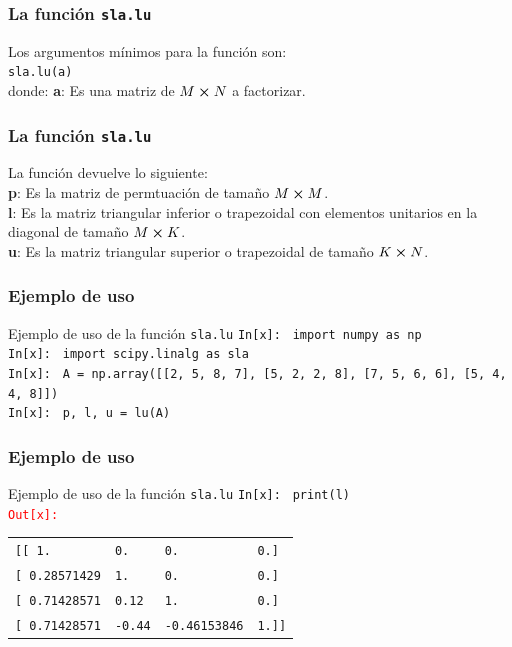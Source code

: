 \begin{frame}[fragile]
\frametitle{La función \texttt{sla.lu}}
Los argumentos mínimos para la función son:
\\
\medskip
\verb|sla.lu(a)|
\\
\medskip
donde:
\textbf{a}: Es una matriz de $M \cp N$ a factorizar.
\end{frame}
\begin{frame}[fragile]
\frametitle{La función \texttt{sla.lu}}
La función devuelve lo siguiente:
\\
\medskip
\textbf{p}: Es la matriz de permtuación de tamaño $M \cp M$.
\\
\medskip
\textbf{l}: Es la matriz triangular inferior o trapezoidal con elementos unitarios en la diagonal de tamaño $M \cp K$.
\\
\medskip
\textbf{u}: Es la matriz triangular superior o trapezoidal de tamaño $K \cp N$.
\end{frame}
\begin{frame}[fragile]
\frametitle{Ejemplo de uso}
\begin{exampleblock}{Ejemplo de uso de la función \texttt{sla.lu}}
\textcolor{ao}{\texttt{In[x]: }} \texttt{import numpy as np} \\
\medskip
\pause
\textcolor{ao}{\texttt{In[x]: }} \texttt{import scipy.linalg as sla} \\
\medskip
\pause
\textcolor{ao}{\texttt{In[x]: }} \texttt{A = np.array([[2, 5, 8, 7], [5, 2, 2, 8], [7, 5, 6, 6], [5, 4, 4, 8]])} \\
\medskip
\pause
\textcolor{ao}{\texttt{In[x]: }} \texttt{p, l, u = lu(A)}
\end{exampleblock}
\end{frame}
\begin{frame}[fragile]
\frametitle{Ejemplo de uso}
\begin{exampleblock}{Ejemplo de uso de la función \texttt{sla.lu}}
\textcolor{ao}{\texttt{In[x]: }} \texttt{print(l)} \\
\medskip
\pause
\textcolor{red}{\texttt{Out[x]: }}
\begin{table}
\begin{tabular}{l l l l}
\texttt{[[ 1.} & \texttt{0.} & \texttt{0.} & \texttt{0.]} \\
\texttt{[ 0.28571429} & \texttt{1.} & \texttt{0.} & \texttt{0.]} \\
\texttt{[ 0.71428571} & \texttt{0.12} & \texttt{1.} & \texttt{0.]} \\
\texttt{[ 0.71428571} & \texttt{-0.44} & \texttt{-0.46153846} & \texttt{1.]]}
\end{tabular}
\end{table}
\end{exampleblock}
\end{frame}
